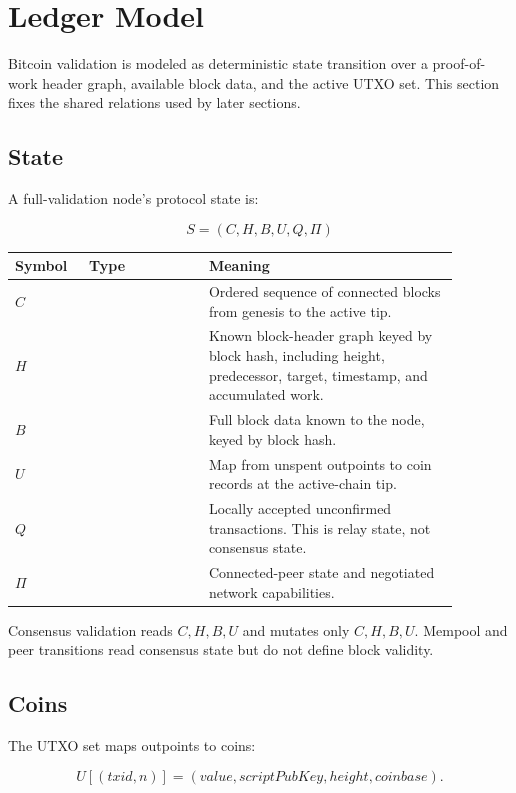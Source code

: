 \section{Ledger Model}
\label{sec:ledger-model}

Bitcoin validation is modeled as deterministic state transition over a
proof-of-work header graph, available block data, and the active UTXO set. This
section fixes the shared relations used by later sections.

\subsection{State}

A full-validation node's protocol state is:

\[
  S = (C,H,B,U,Q,\Pi)
\]

\begin{longtable}{@{}L{0.14\linewidth}L{0.24\linewidth}L{0.50\linewidth}@{}}
\toprule
Symbol & Type & Meaning \\
\midrule
\(C\) &  & Ordered sequence of connected blocks from genesis to the active tip. \\
\(H\) &  & Known block-header graph keyed by block hash, including height, predecessor, target, timestamp, and accumulated work. \\
\(B\) &  & Full block data known to the node, keyed by block hash. \\
\(U\) &  & Map from unspent outpoints to coin records at the active-chain tip. \\
\(Q\) &  & Locally accepted unconfirmed transactions. This is relay state, not consensus state. \\
\(\Pi\) &  & Connected-peer state and negotiated network capabilities. \\
\bottomrule
\end{longtable}

Consensus validation reads \(C,H,B,U\) and mutates only \(C,H,B,U\). Mempool
and peer transitions read consensus state but do not define block validity.

\subsection{Coins}

The UTXO set maps outpoints to coins:

\[
  U[(txid,n)] = (value, scriptPubKey, height, coinbase).
\]

